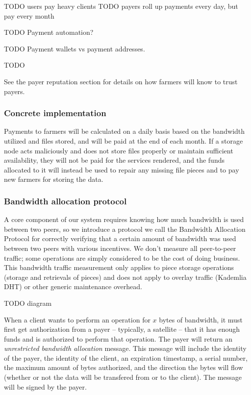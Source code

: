 \documentclass[a4paper,10pt]{article} \usepackage[utf8]{inputenc}
\newcommand{\todo}[1]{{\color{red} TODO #1 }}
\begin{document}
\todo{users pay heavy clients}
\todo{payers roll up payments every day, but pay every month}

\todo{Payment automation?}

\todo{Payment wallets vs payment addresses. }

\todo{}

See the payer reputation section for details on
how farmers will know to trust payers.

\subsubsection{Concrete implementation}

Payments to farmers will be calculated on a daily basis based on the bandwidth
utilized and files stored, and will be paid at the end of each month. 
If a storage node acts
maliciously and does not store files properly or maintain sufficient
availability, they will not be paid for the services rendered, and the funds
allocated to it will instead be used to repair any missing
file pieces and to pay new farmers for storing the data.

\subsubsection{Bandwidth allocation protocol}

A core component of our system requires knowing how much bandwidth is used
between two peers, so we introduce a protocol we call the Bandwidth Allocation
Protocol for correctly verifying that a certain amount of bandwidth was used
between two peers with various incentives. 
We don't measure all peer-to-peer traffic; 
some operations are simply considered to be
the cost of doing business. This bandwidth traffic measurement only applies
to piece storage operations (storage and retrievals of pieces) and does not
apply to overlay traffic (Kademlia DHT) or other generic maintenance overhead.

\todo{diagram}

When a client wants to perform an operation for $x$ bytes of bandwidth, it must
first get authorization from a payer -- typically, a satellite -- 
that it has enough funds and is authorized to perform that operation. 
The payer will return an {\em unrestricted
bandwidth allocation} message. This message will include the identity of the
payer, the identity of the client, an expiration timestamp, a serial number,
the maximum amount of bytes authorized, and the direction the bytes will flow
(whether or not the data will be transfered from or to the client).
The message will be signed by the payer. 
\end{document}
